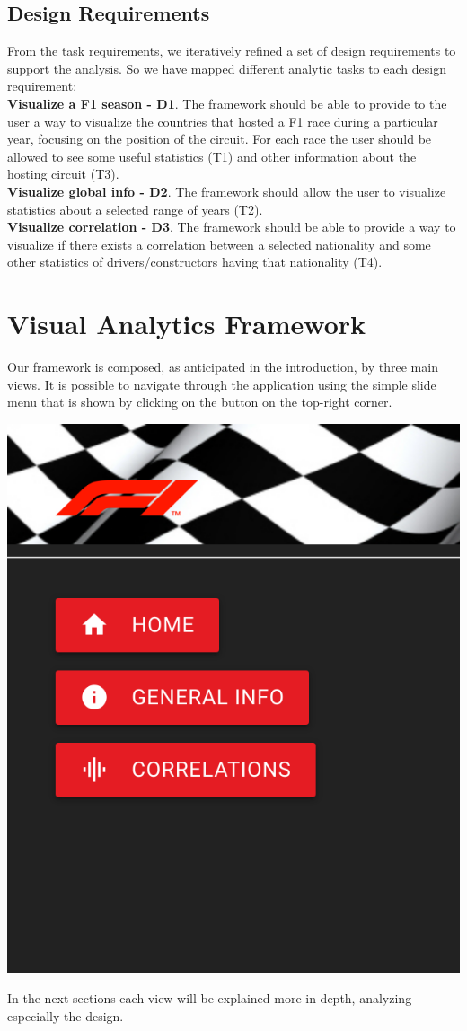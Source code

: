 \documentclass[11pt,twocolumn,letterpaper]{article}
\begin{document}
\subsection{Design Requirements}
From the task requirements, we iteratively refined a set of design requirements to support the analysis. So we have mapped different analytic tasks to each design requirement:\\
\textbf{Visualize a F1 season - D1}. The framework should be able to provide to the user a way to visualize the countries that hosted a F1 race during a particular year, focusing on the position of the circuit. For each race the user should be allowed to see some useful statistics (T1) and other information about the hosting circuit (T3).\\
\textbf{Visualize global info - D2}. The framework should allow the user to visualize statistics about a selected range of years (T2).\\
\textbf{Visualize correlation - D3}. The framework should be able to provide a way to visualize if there exists a correlation between a selected nationality and some other statistics of drivers/constructors having that nationality (T4).

\section{Visual Analytics Framework}
Our framework is composed, as anticipated in the introduction, by three main views. It is possible to navigate through the application using the simple slide menu that is shown by clicking on the button on the top-right corner.
\begin{center}
	\centering
	\includegraphics[width=0.3\columnwidth]{menu}
\end{center}
In the next sections each view will be explained more in depth, analyzing especially the design.
\end{document}
